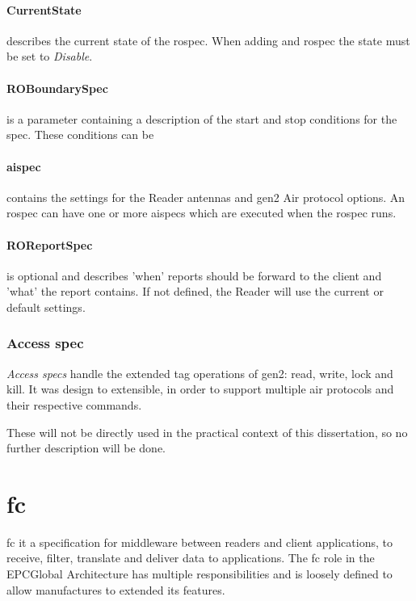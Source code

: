 \paragraph{CurrentState} describes the current state of the \ac{rospec}. When adding and \ac{rospec} the state must be set to \emph{Disable}.

\paragraph{ROBoundarySpec} is a parameter containing a description of the start and stop conditions for the \ac{spec}. These conditions can be

\paragraph{\ac{aispec}} contains the settings for the Reader antennas and \ac{gen2} Air protocol options. An \ac{rospec} can have one or more \acp{aispec} which are executed when the \ac{rospec} runs.

\paragraph{ROReportSpec} is optional and describes 'when' reports should be forward to the client and 'what' the report contains. If not defined, the Reader will use the current or default settings.

\subsubsection{Access \ac{spec}}

\emph{Access \acp{spec}} handle the extended tag operations of \ac{gen2}: read, write, lock and kill.
It was design to extensible, in order to support multiple air protocols and their respective commands.

These will not be directly used in the practical context of this dissertation, so no further description will be done.

\section{\acf{fc}}

\ac{fc} it a specification for middleware between readers and client applications, to receive, filter, translate and deliver data to applications.
The \ac{fc} role in the EPCGlobal Architecture has multiple responsibilities and is loosely defined to  allow manufactures to extended its features. 

